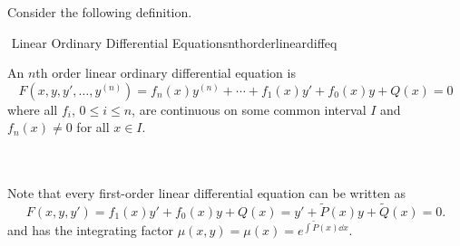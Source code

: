         Consider the following definition.
        \begin{definition}{\Stop\,\,Linear Ordinary Differential Equations}{nthorderlineardiffeq}

            An \(n\)th order linear ordinary differential equation is
            \begin{equation*}
                F(x,y,y',\ldots,y^{(n)})=f_n(x)y^{(n)}+\cdots+f_1(x)y'+f_0(x)y+Q(x)=0
            \end{equation*}
            where all \(f_i\), \(0\leq i\leq n\), are continuous on some common interval \(I\) and \(f_n(x)\neq0\) for all \(x\in I\).
            
        \end{definition}
        \vphantom
        \\
        \\
        Note that every first-order linear differential equation can be written as 
        \begin{equation*}
            F(x,y,y')=f_1(x)y'+f_0(x)y+Q(x)=y'+\tilde{P}(x)y+\tilde{Q}(x)=0.
        \end{equation*}
        and has the integrating factor \(\mu(x,y)=\mu(x)=e^{\int \tilde{P}(x)\dd x}\).